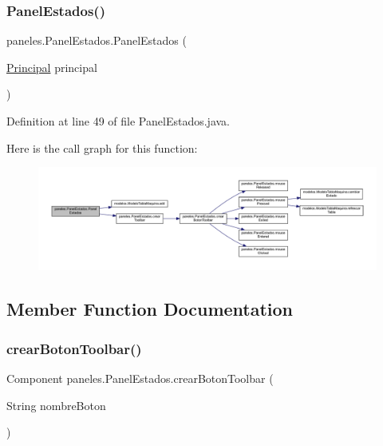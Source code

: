 \subsubsection{\texorpdfstring{Panel\+Estados()}{PanelEstados()}}
{\footnotesize\ttfamily paneles.\+Panel\+Estados.\+Panel\+Estados (\begin{DoxyParamCaption}\item[{\mbox{\hyperlink{classvistas_1_1_principal}{Principal}}}]{principal }\end{DoxyParamCaption})}



Definition at line 49 of file Panel\+Estados.\+java.

Here is the call graph for this function\+:
\nopagebreak
\begin{figure}[H]
\begin{center}
\leavevmode
\includegraphics[width=350pt]{classpaneles_1_1_panel_estados_a58b73ebb992e4dd681a60d7d1d8497c2_cgraph}
\end{center}
\end{figure}


\subsection{Member Function Documentation}
\mbox{\label{classpaneles_1_1_panel_estados_af627b3edddac65046fd93dc774904597}} 
\subsubsection{\texorpdfstring{crear\+Boton\+Toolbar()}{crearBotonToolbar()}}
{\footnotesize\ttfamily Component paneles.\+Panel\+Estados.\+crear\+Boton\+Toolbar (\begin{DoxyParamCaption}\item[{String}]{nombre\+Boton }\end{DoxyParamCaption})}



